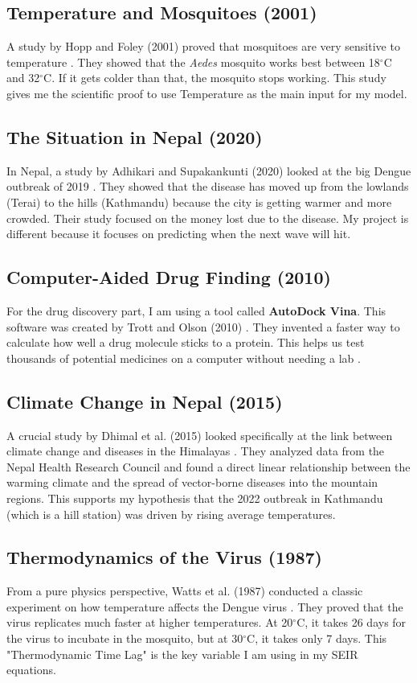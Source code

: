 \documentclass[12pt, a4paper]{article}
\begin{document}
\subsection{Temperature and Mosquitoes (2001)}
A study by Hopp and Foley (2001) proved that mosquitoes are very sensitive to temperature \cite{ref4}. They showed that the \textit{Aedes} mosquito works best between 18$^{\circ}$C and 32$^{\circ}$C. If it gets colder than that, the mosquito stops working. This study gives me the scientific proof to use Temperature as the main input for my model.

\subsection{The Situation in Nepal (2020)}
In Nepal, a study by Adhikari and Supakankunti (2020) looked at the big Dengue outbreak of 2019 \cite{ref3}. They showed that the disease has moved up from the lowlands (Terai) to the hills (Kathmandu) because the city is getting warmer and more crowded. Their study focused on the money lost due to the disease. My project is different because it focuses on predicting when the next wave will hit.

\subsection{Computer-Aided Drug Finding (2010)}
For the drug discovery part, I am using a tool called \textbf{AutoDock Vina}. This software was created by Trott and Olson (2010) \cite{ref6}. They invented a faster way to calculate how well a drug molecule sticks to a protein. This helps us test thousands of potential medicines on a computer without needing a lab \cite{ref7}.

\subsection{Climate Change in Nepal (2015)}
A crucial study by Dhimal et al. (2015) looked specifically at the link between climate change and diseases in the Himalayas \cite{ref8}. They analyzed data from the Nepal Health Research Council and found a direct linear relationship between the warming climate and the spread of vector-borne diseases into the mountain regions. This supports my hypothesis that the 2022 outbreak in Kathmandu (which is a hill station) was driven by rising average temperatures.

\subsection{Thermodynamics of the Virus (1987)}
From a pure physics perspective, Watts et al. (1987) conducted a classic experiment on how temperature affects the Dengue virus \cite{ref9}. They proved that the virus replicates much faster at higher temperatures. At 20$^{\circ}$C, it takes 26 days for the virus to incubate in the mosquito, but at 30$^{\circ}$C, it takes only 7 days. This "Thermodynamic Time Lag" is the key variable I am using in my SEIR equations.
\end{document}
